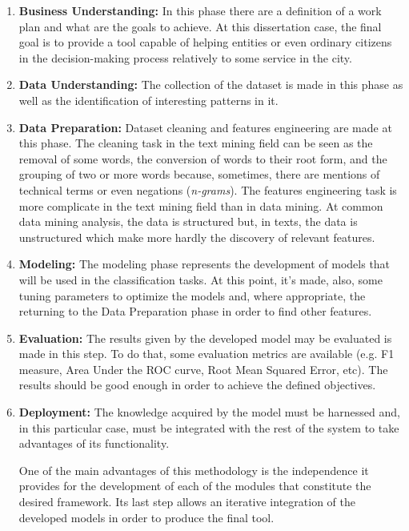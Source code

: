 \begin{enumerate}
\item \textbf{Business Understanding:} In this phase there are a definition of a work plan and what are the goals to achieve. At this dissertation case, the final goal is to provide a tool capable of helping entities or even ordinary citizens in the decision-making process relatively to some service in the city.
\item \textbf{Data Understanding:} The collection of the dataset is made in this phase as well as the identification of interesting patterns in it.

\item \textbf{Data Preparation:} Dataset cleaning and features engineering are made at this phase. The cleaning task in the text mining field can be seen as the removal of some words, the conversion of words to their root form, and the grouping of two or more words because, sometimes, there are mentions of technical terms or even negations (\textit{n-grams}). The features engineering task is more complicate in the text mining field than in data mining. At common data mining analysis, the data is structured but, in texts, the data is unstructured which make more hardly the discovery of relevant features.

\item \textbf{Modeling:} The modeling phase represents the development of models that will be used in the classification tasks. At this point, it's made, also, some tuning parameters to optimize the models and, where appropriate, the returning to the Data Preparation phase in order to find other features.

\item \textbf{Evaluation:} The results given by the developed model may be evaluated is made in this step. To do that, some evaluation metrics are available (e.g. F1 measure, Area Under the ROC curve, Root Mean Squared Error, etc). The results should be good enough in order to achieve the defined objectives. 

\item \textbf{Deployment:} The knowledge acquired by the model must be harnessed and, in this particular case, must be integrated with the rest of the system to take advantages of its functionality.

One of the main advantages of this methodology is the independence it provides for the development of each of the modules that constitute the desired framework. Its last step allows an iterative integration of the developed models in order to produce the final tool.
\end{enumerate}

